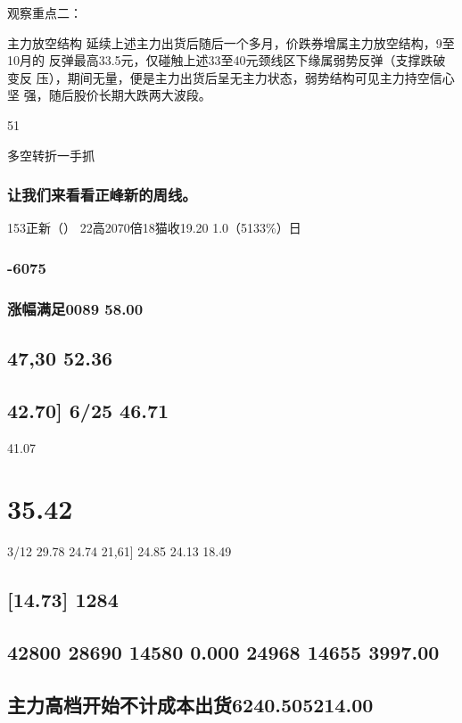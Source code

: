 \documentclass{article}
\begin{document}
观察重点二：

主力放空结构 延续上述主力出货后随后一个多月，价跌券增属主力放空结构，9至10月的 反弹最高33.5元，仅碰触上述33至40元颈线区下缘属弱势反弹（支撑跌破变反 压），期间无量，便是主力出货后呈无主力状态，弱势结构可见主力持空信心坚 强，随后股价长期大跌两大波段。

51

\clearpage

多空转折一手抓

\subsubsection{让我们来看看正峰新的周线。}

153正新（） 22高2070倍18猫收19.20 1.0（5133\%）日

\subsubsection{-6075}

\subsubsection{涨幅满足0089 58.00}

\subsection{47,30 52.36}

\subsection{42.70] 6/25 46.71}

41.07

\section{35.42}

3/12 29.78 24.74 21,61] 24.85 24.13 18.49

\subsection{[14.73] 1284}

\subsection{42800 28690 14580 0.000 24968 14655 3997.00}

\subsection{主力高档开始不计成本出货6240.505214.00}
\end{document}
